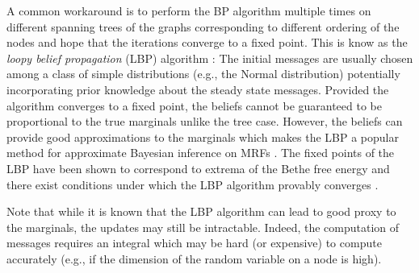 A common workaround is to perform the BP algorithm multiple times on different spanning trees of the graphs corresponding to different ordering of the nodes and hope that the iterations converge to a fixed point. This is know as the \emph{loopy belief propagation} (LBP) algorithm \citep{pearl88, yedidia02}:
%
%
The initial messages are usually chosen among a class of simple distributions (e.g., the Normal distribution) potentially incorporating prior knowledge about the steady state messages. 
Provided the algorithm converges to a fixed point, the beliefs cannot be guaranteed to be proportional to the true marginals unlike the tree case. However, the beliefs can provide good approximations to the marginals which makes the LBP a popular method for approximate Bayesian inference on MRFs \citep{sudderth03}. The fixed points of the LBP have been shown to correspond to extrema of the Bethe free energy \citep{yedidia02} and there exist conditions under which the LBP algorithm provably converges \citep{heskes04,ihler05}.

Note that while it is known that the LBP algorithm can lead to good proxy to the marginals, the updates may still be intractable. Indeed, the computation of messages requires an integral which may be hard (or expensive) to compute accurately (e.g., if the dimension of the random variable on a node is high).








